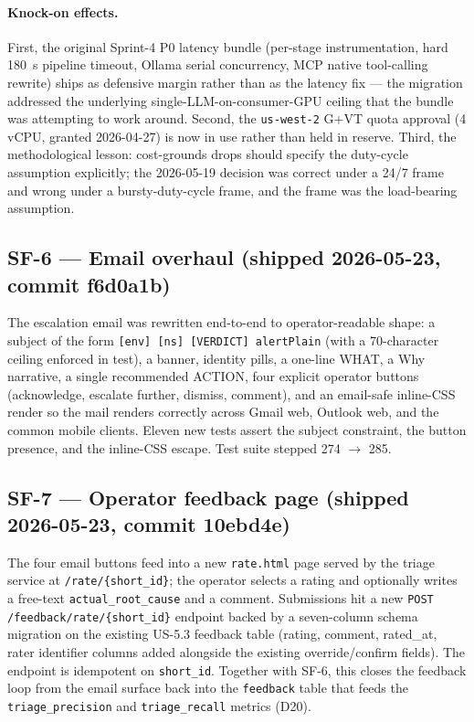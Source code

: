 \documentclass[11pt,a4paper,oneside]{report}
\begin{document}
\paragraph{Knock-on effects.}
First, the original Sprint-4 P0 latency bundle (per-stage
instrumentation, hard 180~s pipeline timeout, Ollama serial
concurrency, MCP native tool-calling rewrite) ships as defensive
margin rather than as the latency fix --- the migration
addressed the underlying single-LLM-on-consumer-GPU ceiling that
the bundle was attempting to work around.  Second, the
\texttt{us-west-2} G+VT quota approval (4 vCPU, granted
2026-04-27) is now in use rather than held in reserve.  Third,
the methodological lesson: cost-grounds drops should specify the
duty-cycle assumption explicitly; the 2026-05-19 decision was
correct under a 24/7 frame and wrong under a bursty-duty-cycle
frame, and the frame was the load-bearing assumption.

\subsection{SF-6 --- Email overhaul (shipped 2026-05-23, commit f6d0a1b)}

The escalation email was rewritten end-to-end to operator-readable
shape: a subject of the form
\texttt{[env] [ns] [VERDICT] alertPlain} (with a 70-character
ceiling enforced in test), a banner, identity pills, a one-line
WHAT, a Why narrative, a single recommended ACTION, four
explicit operator buttons (acknowledge, escalate further,
dismiss, comment), and an email-safe inline-CSS render so the
mail renders correctly across Gmail web, Outlook web, and the
common mobile clients.  Eleven new tests assert the subject
constraint, the button presence, and the inline-CSS escape.  Test
suite stepped 274 $\to$ 285.

\subsection{SF-7 --- Operator feedback page (shipped 2026-05-23, commit 10ebd4e)}

The four email buttons feed into a new \texttt{rate.html} page
served by the triage service at
\texttt{/rate/\{short\_id\}}; the operator selects a rating and
optionally writes a free-text \texttt{actual\_root\_cause} and a
comment.  Submissions hit a new
\texttt{POST /feedback/rate/\{short\_id\}} endpoint backed by a
seven-column schema migration on the existing US-5.3 feedback
table (rating, comment, rated\_at, rater identifier columns added
alongside the existing override/confirm fields).  The endpoint is
idempotent on \texttt{short\_id}.  Together with SF-6, this closes
the feedback loop from the email surface back into the
\texttt{feedback} table that feeds the \texttt{triage\_precision}
and \texttt{triage\_recall} metrics (D20).
\end{document}
